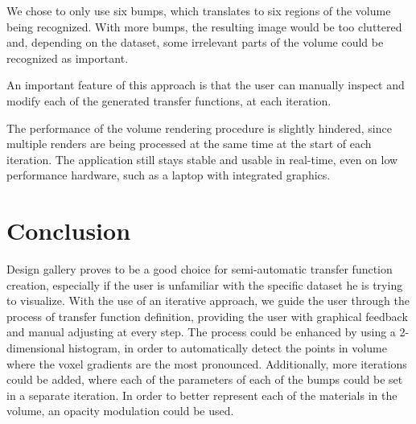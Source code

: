 \documentclass{egpubl-eurovis-short}
\begin{document}
We chose to only use six bumps, which translates to six regions of the volume being recognized. With more bumps, the resulting image would be too cluttered and, depending on the dataset, some irrelevant parts of the volume could be recognized as important. 

An important feature of this approach is that the user can manually inspect and modify each of the generated transfer functions, at each iteration.  

The performance of the volume rendering procedure is slightly hindered, since multiple renders are being processed at the same time at the start of each iteration. The application still stays stable and usable in real-time, even on low performance hardware, such as a laptop with integrated graphics. 


\section{Conclusion}
Design gallery proves to be a good choice for semi-automatic transfer function creation, especially if the user is unfamiliar with the specific dataset he is trying to visualize. With the use of an iterative approach, we guide the user through the process of transfer function definition, providing the user with graphical feedback and manual adjusting at every step. 
The process could be enhanced by using a 2-dimensional histogram, in order to automatically detect the points in volume where the voxel gradients are the most pronounced. Additionally, more iterations could be added, where each of the parameters of each of the bumps could be set in a separate iteration. In order to better represent each of the materials in the volume, an opacity modulation could be used. 


%




\end{document}

